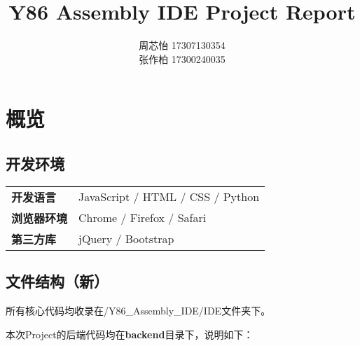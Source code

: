 \documentclass[12pt]{article} %
\title{\textbf{Y86 Assembly IDE Project Report}}
\author{周芯怡 17307130354\\张作柏 17300240035}
\begin{document}
\begin{sloppypar}
\maketitle

\pagestyle{fancy}
\lhead{\textbf{{\thetitle}}}
\rhead{\textbf{\nouppercase{\firstleftmark}}}
\cfoot{\thepage}

\tableofcontents
\clearpage



\section{概览}

\subsection{开发环境}

\begin{table}[h]
\begin{tabular}{ll}
{\bf 开发语言}   & JavaScript / HTML / CSS / Python  \\
{\bf 浏览器环境} & Chrome / Firefox / Safari \\
{\bf 第三方库}   & jQuery / Bootstrap                             
\end{tabular}
\end{table}

\subsection{文件结构（新）}

所有核心代码均收录在/Y86\_Assembly\_IDE/IDE文件夹下。

\noindent
本次Project的后端代码均在{\bf backend}目录下，说明如下：


\end{sloppypar}
\end{document}
